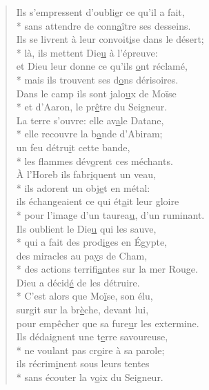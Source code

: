 \begin{verse}
Ils s’empressent d’oubli\underline{e}r ce qu’il a fait, \\*
sans attendre de conn\underline{a}ître ses desseins. \\
Ils se livrent à leur convoit\underline{i}se dans le désert; \\*
là, ils mettent Die\underline{u} à l’épreuve: \\
et Dieu leur donne ce qu’ils \underline{o}nt réclamé, \\*
mais ils trouvent ses d\underline{o}ns dérisoires. \\

Dans le camp ils sont jalo\underline{u}x de Moïse \\*
et d’Aaron, le pr\underline{ê}tre du Seigneur. \\
La terre s’ouvre: elle av\underline{a}le Datane, \\*
elle recouvre la b\underline{a}nde d’Abiram; \\
un feu détru\underline{i}t cette bande, \\*
les flammes dév\underline{o}rent ces méchants. \\

À l’Horeb ils fabr\underline{i}quent un veau, \\*
ils adorent un obj\underline{e}t en métal: \\
ils échangeaient ce qui ét\underline{a}it leur gloire \\*
pour l’image d’un taurea\underline{u}, d’un ruminant. \\

Ils oublient le Die\underline{u} qui les sauve, \\*
qui a fait des prod\underline{i}ges en Égypte, \\
des miracles au pa\underline{y}s de Cham, \\*
des actions terrifi\underline{a}ntes sur la mer Rouge. \\

Dieu a décid\underline{é} de les détruire. \\*
C’est alors que Mo\underline{ï}se, son élu, \\
surgit sur la br\underline{è}che, devant lui, \\
pour empêcher que sa fure\underline{u}r les extermine. \\

Ils dédaignent une t\underline{e}rre savoureuse, \\*
ne voulant pas cr\underline{o}ire à sa parole; \\
ils récrim\underline{i}nent sous leurs tentes \\*
sans écouter la v\underline{o}ix du Seigneur. \\


\end{verse}
